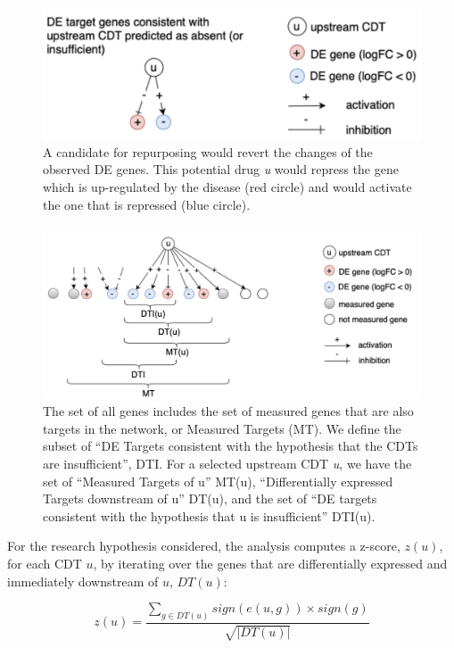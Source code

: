\begin{figure}
\centering
	\includegraphics[width=0.6\linewidth]{../Figures/TwoHypotheses.png}
        \caption{A candidate for repurposing would revert the changes of the  observed DE genes. This potential drug \emph{u} would repress the  gene which is up-regulated by the disease (red circle) and would activate the one that is repressed (blue circle). }
        \label{TwoHypotheses}
\end{figure}

\begin{figure}
	\includegraphics[width=0.9\linewidth]{../Figures/MeasuredGenes.png}
        \caption{The set of all genes includes the set of measured genes that are also targets in the network, or Measured Targets (MT). We define the subset of ``DE Targets consistent with the hypothesis that the CDTs are  insufficient'', DTI. For a selected upstream CDT \emph{u}, we have the set of ``Measured Targets of u'' MT(u), ``Differentially expressed Targets downstream of u'' DT(u), and the set of ``DE targets consistent with the hypothesis that u is insufficient'' DTI(u).}
        \label{MeasuredGenes}
\end{figure}


For the research hypothesis considered, the analysis computes a z-score, $z(u)$, for each CDT $u$, by iterating over the genes that are differentially expressed and immediately downstream of $u$, $DT(u)$: 


\begin{equation}
\label{eq:zscore}
z(u)=\frac{\sum\limits_{g \in DT(u)} sign(e(u,g)) \times sign(g)}{\sqrt{|DT(u)|}}
\end{equation}

